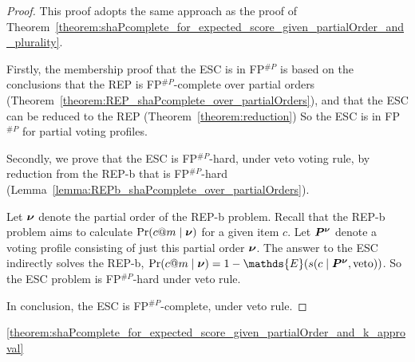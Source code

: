 \begin{proof}
    This proof adopts the same approach as the proof of Theorem~\ref{theorem:shaPcomplete_for_expected_score_given_partialOrder_and_plurality}.
    
    Firstly, the membership proof that the ESC is in FP$^{\#P}$ is based on the conclusions that the REP is FP$^{\#P}$-complete over partial orders (Theorem~\ref{theorem:REP_shaPcomplete_over_partialOrders}), and that the ESC can be reduced to the REP (Theorem~\ref{theorem:reduction})
    So the ESC is in FP$^{\#P}$ for partial voting profiles.
    
    Secondly, we prove that the ESC is FP$^{\#P}$-hard, under veto voting rule, by reduction from the REP-b that is FP$^{\#P}$-hard (Lemma~\ref{lemma:REPb_shaPcomplete_over_partialOrders}).
    
    Let $\bm{\nu}$ denote the partial order of the REP-b problem.
    Recall that the REP-b problem aims to calculate $\Pr(c@m \mid \bm{\nu})$ for a given item $c$.
    Let $\bm{P}^{\bm{\nu}}$ denote a voting profile consisting of just this partial order $\bm{\nu}$.
    The answer to the ESC indirectly solves the REP-b, \ie $\Pr(c@m \mid \partialOrder) = 1 - \mathds{E}(\score(c \mid \VP^{\partialOrder}, \text{veto}))$.
    So the ESC problem is FP$^{\#P}$-hard under veto rule.
    
    In conclusion, the ESC is FP$^{\#P}$-complete, under veto rule.
\end{proof}

\begin{reptheorem}{\ref{theorem:shaPcomplete_for_expected_score_given_partialOrder_and_k_approval}}
    \theoremHardnessForExpectedScoreGivenPartialOrderAndKApproval
\end{reptheorem}

